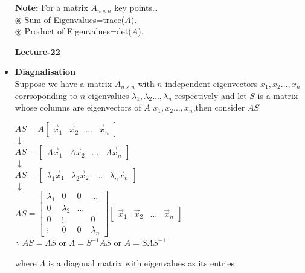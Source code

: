 \documentclass[a4paper,11pt]{article}
\numberwithin{equation}{section}
\begin{document}
\begin{itemize}
\textbf{Note: }For a matrix $A_{n\times n}$ key points\dots\\

$\circledast$ Sum of Eigenvalues=trace($A$).\\
$\circledast$ Product of Eigenvalues=det($A$).\\

\begin{center}
    \Huge{\textbf{Lecture-22}}
\end{center}
\vspace{5pt}


\item \textbf{Diagnalisation}\\

Suppose we have a matrix $A_{n\times n}$ with $n$ independent eigenvectors $x_1,x_2\dots,x_n$ corrsoponding to $n$ eigenvalues $\lambda_1,\lambda_2\dots,\lambda_n$ respectively and let $S$ is a matrix whose columns are eigenvectors of $A$ $x_1,x_2\dots,x_n$,then consider $AS$
\begin{center}
    $AS=A\begin{bmatrix}
        \vec{x}_1&\vec{x}_2&\dots&\vec{x}_n
    \end{bmatrix}$\\
    $\downarrow$\\
    $AS=\begin{bmatrix}
        A\vec{x}_1&A\vec{x}_2&\dots&A\vec{x}_n
    \end{bmatrix}$\\
    $\downarrow$\\
    $AS=\begin{bmatrix}
        \lambda_1\vec{x}_1&\lambda_2\vec{x}_2&\dots&\lambda_n\vec{x}_n
    \end{bmatrix}$\\
    $\downarrow$\\
    $AS=\begin{bmatrix}
        \lambda_1&0&0&\dots\\
        0&\lambda_2&\dots&\\
        0&\vdots&&0\\
        \vdots&0&0&\lambda_n
    \end{bmatrix}\begin{bmatrix}
        \vec{x}_1&\vec{x}_2&\dots&\vec{x}_n
    \end{bmatrix}$\\
    \vspace{1cm}
    $\therefore$ $AS=\varLambda S$\hspace{4pt} or \hspace{4pt} $\varLambda=S^{-1}AS$\hspace{4pt} or \hspace{4pt} $A=S\varLambda S^{-1}$
\end{center}
where $\varLambda$ is a diagonal matrix with eigenvalues as its entries\\


\end{itemize}
\end{document}
